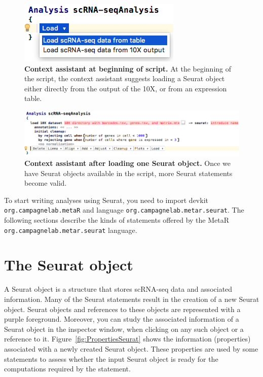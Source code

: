 \begin{figure}
  \centering
  \includegraphics[width=\figWidthSmall]{figures/ContextAssistantBeg.png}
    \caption[Context assistant at beginning of script.]{\textbf{Context assistant at
    beginning of script.} At the beginning of the script, the
    context assistant suggests loading a Seurat object either directly from the output
    of the 10X, or from an expression table.}
\label{fig:ContextAssistantBeg}
\end{figure}

\begin{figure}[h!tbp]
  \centering
  \includegraphics[width=\figWidthWide]{figures/ContextAssistantMid.png}
    \caption[Context assistant after loading one Seurat object.]{\textbf{Context
    assistant after loading one Seurat object.} Once we have Seurat objects
    available in the script, more Seurat statements become valid.}
\label{fig:ContextAssistantMid}
\end{figure}

To start writing analyses using Seurat, you need to import devkit
\texttt{org\allowbreak.campagne\allowbreak{}lab\allowbreak.metaR}
and language \texttt{org\allowbreak.campagne\allowbreak{}lab\allowbreak.metar\allowbreak.seurat}.
\noindent The following sections describe the kinds of statements offered by the MetaR
\texttt{org\allowbreak.campagne\allowbreak{}lab\allowbreak.metar\allowbreak.seurat} language.

\section{The Seurat object}
A Seurat object is a structure that stores scRNA-seq data and associated information. Many of
the Seurat statements result in the creation of a new Seurat object. Seurat objects and
references to these objects are represented with a purple foreground. Moreover, you can
study the associated information of a Seurat object in the inspector window, when clicking
on any such object or a reference to it. Figure~\ref{fig:PropertiesSeurat} shows the
information (properties) associated with a newly created Seurat object. These properties
are used by some statements to assess whether the input Seurat object is ready for the computations
required by the statement.

